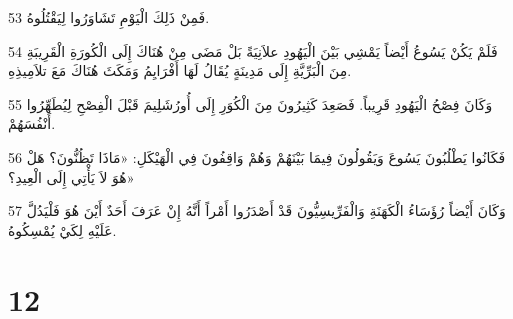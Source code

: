\par 53 فَمِنْ ذَلِكَ الْيَوْمِ تَشَاوَرُوا لِيَقْتُلُوهُ.
\par 54 فَلَمْ يَكُنْ يَسُوعُ أَيْضاً يَمْشِي بَيْنَ الْيَهُودِ علاَنِيَةً بَلْ مَضَى مِنْ هُنَاكَ إِلَى الْكُورَةِ الْقَرِيبَةِ مِنَ الْبَرِّيَّةِ إِلَى مَدِينَةٍ يُقَالُ لَهَا أَفْرَايِمُ وَمَكَثَ هُنَاكَ مَعَ تلاَمِيذِهِ.
\par 55 وَكَانَ فِصْحُ الْيَهُودِ قَرِيباً. فَصَعِدَ كَثِيرُونَ مِنَ الْكُوَرِ إِلَى أُورُشَلِيمَ قَبْلَ الْفِصْحِ لِيُطَهِّرُوا أَنْفُسَهُمْ.
\par 56 فَكَانُوا يَطْلُبُونَ يَسُوعَ وَيَقُولُونَ فِيمَا بَيْنَهُمْ وَهُمْ وَاقِفُونَ فِي الْهَيْكَلِ: «مَاذَا تَظُنُّونَ؟ هَلْ هُوَ لاَ يَأْتِي إِلَى الْعِيدِ؟»
\par 57 وَكَانَ أَيْضاً رُؤَسَاءُ الْكَهَنَةِ وَالْفَرِّيسِيُّونَ قَدْ أَصْدَرُوا أَمْراً أَنَّهُ إِنْ عَرَفَ أَحَدٌ أَيْنَ هُوَ فَلْيَدُلَّ عَلَيْهِ لِكَيْ يُمْسِكُوهُ.

\chapter{12}


